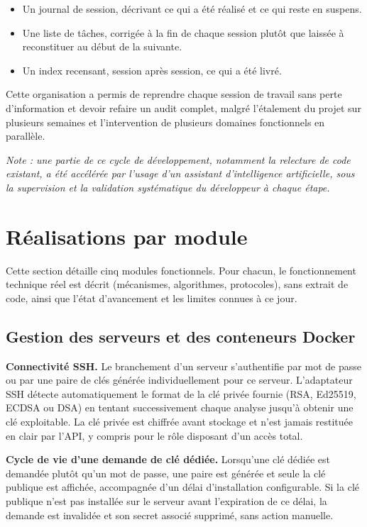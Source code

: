 \begin{itemize}
  \item Un journal de session, décrivant ce qui a été réalisé et ce qui
        reste en suspens.
  \item Une liste de tâches, corrigée à la fin de chaque session plutôt
        que laissée à reconstituer au début de la suivante.
  \item Un index recensant, session après session, ce qui a été livré.
\end{itemize}

Cette organisation a permis de reprendre chaque session de travail sans
perte d'information et devoir refaire un audit complet, malgré l'étalement du projet sur plusieurs semaines
et l'intervention de plusieurs domaines fonctionnels en parallèle.

\bigskip
\noindent\textit{Note : une partie de ce cycle de développement,
notamment la relecture de code existant, a été accélérée par l'usage d'un assistant d'intelligence
artificielle, sous la supervision et la validation systématique du développeur à chaque étape.}




\section{Réalisations par module}

Cette section détaille cinq modules fonctionnels. Pour chacun, le
fonctionnement technique réel est décrit (mécanismes, algorithmes,
protocoles), sans extrait de code, ainsi que l'état d'avancement et les
limites connues à ce jour.

\subsection{Gestion des serveurs et des conteneurs Docker}

\textbf{Connectivité SSH.} Le branchement d'un serveur s'authentifie par
mot de passe ou par une paire de clés générée individuellement pour ce
serveur. L'adaptateur SSH détecte automatiquement le format de la clé
privée fournie (RSA, Ed25519, ECDSA ou DSA) en tentant successivement
chaque analyse jusqu'à obtenir une clé exploitable. La clé privée est
chiffrée avant stockage et n'est jamais restituée en clair par l'API,
y compris pour le rôle disposant d'un accès total.

\textbf{Cycle de vie d'une demande de clé dédiée.} Lorsqu'une clé
dédiée est demandée plutôt qu'un mot de passe, une paire est générée et
seule la clé publique est affichée, accompagnée d'un délai
d'installation configurable. Si la clé publique n'est pas installée sur
le serveur avant l'expiration de ce délai, la demande est invalidée et
son secret associé supprimé, sans action manuelle.

